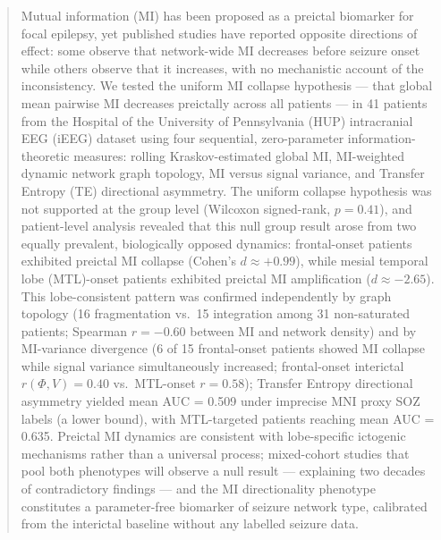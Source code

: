 \documentclass[final,5p,times,twocolumn]{elsarticle}
\begin{document}
\begin{frontmatter}
\begin{abstract}
Mutual information (MI) has been proposed as a preictal biomarker for
focal epilepsy, yet published studies have reported opposite directions
of effect: some observe that network-wide MI decreases before seizure
onset while others observe that it increases, with no mechanistic
account of the inconsistency.
%
We tested the uniform MI collapse hypothesis --- that global mean
pairwise MI decreases preictally across all patients --- in 41 patients
from the Hospital of the University of Pennsylvania (HUP) intracranial
EEG (iEEG) dataset using four sequential, zero-parameter
information-theoretic measures: rolling Kraskov-estimated global MI,
MI-weighted dynamic network graph topology, MI versus signal variance,
and Transfer Entropy (TE) directional asymmetry.
%
The uniform collapse hypothesis was not supported at the group level
(Wilcoxon signed-rank, $p = 0.41$), and patient-level analysis
revealed that this null group result arose from two
equally prevalent, biologically opposed dynamics: frontal-onset patients
exhibited preictal MI collapse (Cohen's $d \approx +0.99$), while
mesial temporal lobe (MTL)-onset patients exhibited preictal MI
amplification ($d \approx -2.65$).
%
This lobe-consistent pattern was confirmed independently by graph
topology (16 fragmentation vs.\ 15 integration among 31 non-saturated
patients; Spearman $r = -0.60$ between MI and network density) and by
MI-variance divergence (6 of 15 frontal-onset patients showed MI
collapse while signal variance simultaneously increased; frontal-onset
interictal $r(\Phi, V) = 0.40$ vs.\ MTL-onset $r = 0.58$);
Transfer Entropy directional asymmetry yielded mean AUC = 0.509 under
imprecise MNI proxy SOZ labels (a lower bound), with MTL-targeted
patients reaching mean AUC = 0.635.
%
Preictal MI dynamics are consistent with lobe-specific ictogenic mechanisms rather than a universal process;
mixed-cohort studies that pool both phenotypes will observe a null
result --- explaining two decades of contradictory findings --- and the
MI directionality phenotype constitutes a parameter-free biomarker of
seizure network type, calibrated from the interictal baseline without
any labelled seizure data.
\end{abstract}


\end{frontmatter}
\end{document}
